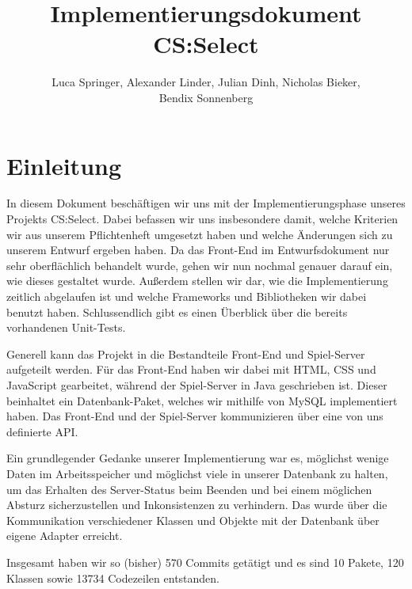 \documentclass[a4paper]{scrreprt}
\begin{document}
\title{Implementierungsdokument CS:Select}
\author{Luca Springer, Alexander Linder, Julian Dinh, Nicholas Bieker,\\ Bendix Sonnenberg}
\maketitle

\tableofcontents


\chapter{Einleitung}

In diesem Dokument beschäftigen wir uns mit der Implementierungsphase unseres Projekts CS:Select. Dabei befassen wir uns insbesondere damit, welche Kriterien wir aus unserem Pflichtenheft umgesetzt haben und welche Änderungen sich zu unserem Entwurf ergeben haben. Da das Front-End im Entwurfsdokument nur sehr oberflächlich behandelt wurde, gehen wir nun nochmal genauer darauf ein, wie dieses gestaltet wurde. Außerdem stellen wir dar, wie die Implementierung zeitlich abgelaufen ist und welche Frameworks und Bibliotheken wir dabei benutzt haben. Schlussendlich gibt es einen Überblick über die bereits vorhandenen Unit-Tests.

\hspace{1cm}

Generell kann das Projekt in die Bestandteile Front-End und Spiel-Server aufgeteilt werden. Für das Front-End haben wir dabei mit HTML, CSS und JavaScript gearbeitet, während der Spiel-Server in Java geschrieben ist. Dieser beinhaltet ein Datenbank-Paket, welches wir mithilfe von MySQL implementiert haben. Das Front-End und der Spiel-Server kommunizieren über eine von uns definierte API.

\hspace{1cm}

Ein grundlegender Gedanke unserer Implementierung war es, möglichst wenige Daten im Arbeitsspeicher und möglichst viele in unserer Datenbank zu halten, um das Erhalten des Server-Status beim Beenden und bei einem möglichen Absturz sicherzustellen und Inkonsistenzen zu verhindern. Das wurde über die Kommunikation verschiedener Klassen und Objekte mit der Datenbank über eigene Adapter erreicht. 

\hspace{1cm}

Insgesamt haben wir so (bisher) 570 Commits getätigt und es sind 10 Pakete, 120 Klassen sowie 13734 Codezeilen entstanden.
\end{document}
